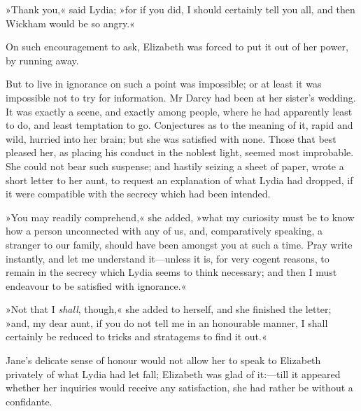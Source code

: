»Thank you,« said Lydia; »for if you did, I should certainly tell you all, and then Wickham would be so angry.«

On such encouragement to ask, Elizabeth was forced to put it out of her power, by running away.

But to live in ignorance on such a point was impossible; or at least it was impossible not to try for information. Mr Darcy had been at her sister's wedding. It was exactly a scene, and exactly among people, where he had apparently least to do, and least temptation to go. Conjectures as to the meaning of it, rapid and wild, hurried into her brain; but she was satisfied with none. Those that best pleased her, as placing his conduct in the noblest light, seemed most improbable. She could not bear such suspense; and hastily seizing a sheet of paper, wrote a short letter to her aunt, to request an explanation of what Lydia had dropped, if it were compatible with the secrecy which had been intended.

»You may readily comprehend,« she added, »what my curiosity must be to know how a person unconnected with any of us, and, comparatively speaking, a stranger to our family, should have been amongst you at such a time. Pray write instantly, and let me understand it—unless it is, for very cogent reasons, to remain in the secrecy which Lydia seems to think necessary; and then I must endeavour to be satisfied with ignorance.«

»Not that I \textit{shall}, though,« she added to herself, and she finished the letter; »and, my dear aunt, if you do not tell me in an honourable manner, I shall certainly be reduced to tricks and stratagems to find it out.«

Jane's delicate sense of honour would not allow her to speak to Elizabeth privately of what Lydia had let fall; Elizabeth was glad of it:—till it appeared whether her inquiries would receive any satisfaction, she had rather be without a confidante.